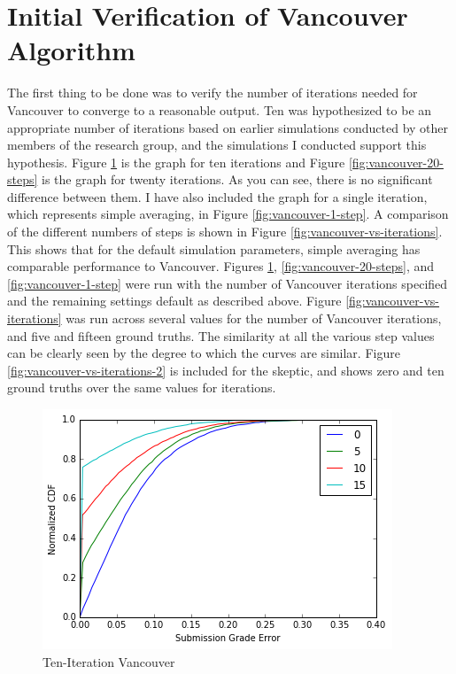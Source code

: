 \documentclass{article}
\begin{document}
	\section{Initial Verification of Vancouver Algorithm}
	The first thing to be done was to verify the number of iterations needed for Vancouver to converge to a reasonable output. Ten was hypothesized to be an appropriate number of iterations based on earlier simulations conducted by other members of the research group, and the simulations I conducted support this hypothesis. Figure \ref{fig:vancouver-10-steps} is the graph for ten iterations and Figure \ref{fig:vancouver-20-steps} is the graph for twenty iterations. As you can see, there is no significant difference between them. I have also included the graph for a single iteration, which represents simple averaging, in Figure \ref{fig:vancouver-1-step}. A comparison of the different numbers of steps is shown in Figure \ref{fig:vancouver-vs-iterations}. This shows that for the default simulation parameters, simple averaging has comparable performance to Vancouver. Figures \ref{fig:vancouver-10-steps}, \ref{fig:vancouver-20-steps}, and \ref{fig:vancouver-1-step}  were run with the number of Vancouver iterations specified and the remaining settings default as described above. Figure \ref{fig:vancouver-vs-iterations} was run across several values for the number of Vancouver iterations, and five and fifteen ground truths. The similarity at all the various step values can be clearly seen by the degree to which the curves are similar. Figure \ref{fig:vancouver-vs-iterations-2} is included for the skeptic, and shows zero and ten ground truths over the same values for iterations.

	\begin{figure}[h]
		\includegraphics{vancouver-10-steps.png}
		\caption{Ten-Iteration Vancouver}
		\label{fig:vancouver-10-steps}
	\end{figure}
	
\end{document}
